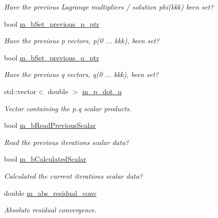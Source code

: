 \begin{DoxyCompactItemize}
\begin{DoxyCompactList}\small\item\em Have the previous Lagrange multipliers / solution {\ttfamily phi(kkk)} been set? \end{DoxyCompactList}\item 
bool \hyperlink{classcarl_1_1_f_e_t_i___operations_ae9861d8f6bfefdf2e7b8be5683e88a6f}{m\+\_\+b\+Set\+\_\+previous\+\_\+p\+\_\+ptr}
\begin{DoxyCompactList}\small\item\em Have the previous {\ttfamily p} vectors, {\ttfamily p(0 ... kkk)}, been set? \end{DoxyCompactList}\item 
bool \hyperlink{classcarl_1_1_f_e_t_i___operations_a9bacd2df5ed75055635acc7336c96bef}{m\+\_\+b\+Set\+\_\+previous\+\_\+q\+\_\+ptr}
\begin{DoxyCompactList}\small\item\em Have the previous {\ttfamily q} vectors, {\ttfamily q(0 ... kkk)}, been set? \end{DoxyCompactList}\item 
std\+::vector$<$ double $>$ \hyperlink{classcarl_1_1_f_e_t_i___operations_acb4f5b5dbc7b71aeb4b2aea3af95a364}{m\+\_\+p\+\_\+dot\+\_\+q}
\begin{DoxyCompactList}\small\item\em Vector containing the {\ttfamily p.\+q} scalar products. \end{DoxyCompactList}\item 
bool \hyperlink{classcarl_1_1_f_e_t_i___operations_ada3f0dbe7b78471f133b8325b7b9b3aa}{m\+\_\+b\+Read\+Previous\+Scalar}
\begin{DoxyCompactList}\small\item\em Read the previous iterations scalar data? \end{DoxyCompactList}\item 
bool \hyperlink{classcarl_1_1_f_e_t_i___operations_a2e115c189d8adcfc8451c505a3a9cb05}{m\+\_\+b\+Calculated\+Scalar}
\begin{DoxyCompactList}\small\item\em Calculated the current iterations scalar data? \end{DoxyCompactList}\item 
double \hyperlink{classcarl_1_1_f_e_t_i___operations_af8d1551035cbf80cc068d096c64e2ca8}{m\+\_\+abs\+\_\+residual\+\_\+conv}
\begin{DoxyCompactList}\small\item\em Absolute residual convergence. \end{DoxyCompactList}\item 

\end{DoxyCompactItemize}
